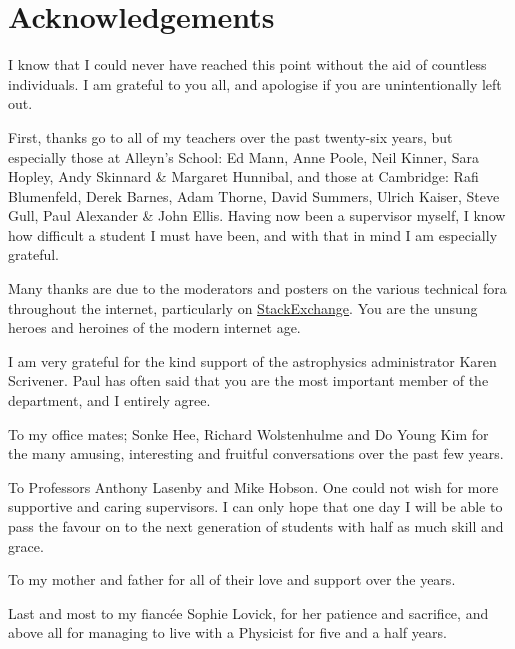 \chapter{Acknowledgements}

I know that I could never have reached this point without the aid of countless individuals. I am grateful to you all, and apologise if you are unintentionally left out.

First, thanks go to all of my teachers over the past twenty-six years, but especially those at Alleyn's School: Ed Mann, Anne Poole, Neil Kinner, Sara Hopley, Andy Skinnard \& Margaret Hunnibal, and those at Cambridge: Rafi Blumenfeld, Derek Barnes, Adam Thorne, David Summers, Ulrich Kaiser, Steve Gull, Paul Alexander \& John Ellis. Having now been a supervisor myself, I know how difficult a student I must have been, and with that in mind I am especially grateful.

Many thanks are due to the moderators and posters on the various technical fora throughout the internet, particularly on \mbox{\href{http://stackexchange.com/}{StackExchange}}. You are the unsung heroes and heroines of the modern internet age.

I am very grateful for the kind support of the astrophysics administrator Karen Scrivener. Paul has often said that you are the most important member of the department, and I entirely agree.

To my office mates; Sonke Hee, Richard Wolstenhulme and Do Young Kim for the many amusing, interesting and fruitful conversations over the past few years. 

To Professors Anthony Lasenby and Mike Hobson. One could not wish for more supportive and caring supervisors. I can only hope that one day I will be able to pass the favour on to the next generation of students with half as much skill and grace.

To my mother and father for all of their love and support over the years.  

Last and most to my fianc\'{e}e Sophie Lovick, for her patience and sacrifice, and above all for managing to live with a Physicist for five and a half years.
